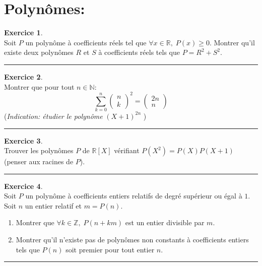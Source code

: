 \documentclass[a4paper,10pt]{article}
\theoremstyle{definition}
\theoremstyle{definition}
\newtheorem{exo}{Exercice}
\newcommand{\R}{\mathbb{R}}
\newcommand{\Z}{\mathbb{Z}}
\newcommand{\N}{\mathbb{N}}
\begin{document}
\section*{Polynômes:}
\begin{minipage}{1\linewidth}
\begin{minipage}[t]{0.48\linewidth}
\raggedright



\begin{exo}\quad\\
Soit $P$ un polynôme à coefficients réels tel que $\forall x\in\R,\;P(x)\geq 0$. Montrer qu'il existe deux polynômes $R$ et $S$ à coefficients réels tels que $P=R^2+S^2$.

\centering
\rule{1\linewidth}{0.6pt}
\end{exo}


\begin{exo}\quad\\
Montrer que pour tout $n\in\N$:
$$\sum_{k=0}^{n}\begin{pmatrix}
n\\k
\end{pmatrix}^2  =  \begin{pmatrix}
2n\\n
\end{pmatrix}$$
(\textit{Indication: étudier le polynôme } $(X+1)^{2n} $ )

\centering\rule{1\linewidth}{0.6pt}
\end{exo}

\begin{exo}\quad\\
Trouver les polynômes $P$ de $\R[X]$ vérifiant $P(X^2)=P(X)P(X+1)$ (penser aux racines de $P$).

\centering
\rule{1\linewidth}{0.6pt}
\end{exo}






\end{minipage}	
\hfill\vrule\hfill
\begin{minipage}[t]{0.48\linewidth}
\raggedright



\begin{exo}\quad\\
Soit $P$ un polynôme à coefficients entiers relatifs de degré supérieur ou égal à $1$. Soit $n$ un entier relatif 
et $m=P(n)$.
\begin{enumerate}
\item  Montrer que $\forall k\in\Z,\;P(n+km)$ est un entier divisible par $m$.
\item  Montrer qu'il n'existe pas de polynômes non constants à coefficients entiers tels que $P(n)$ soit premier pour tout entier $n$.
\end{enumerate}
\centering\rule{1\linewidth}{0.6pt}
\end{exo}


\end{minipage}
\end{minipage}
\end{document}
